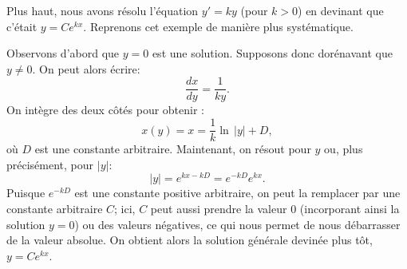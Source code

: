 \begin{example}
	Plus haut, nous avons résolu l'équation $y' = ky$ (pour $k > 0$) en devinant que c'était
	$y=Ce^{kx}$.  Reprenons cet exemple de manière plus systématique.

	Observons d'abord que  $y=0$ est une solution.  Supposons donc dorénavant que $y\not= 0$.
	On peut alors écrire:
	\begin{equation*}
		\frac{dx}{dy} = \frac{1}{ky} .
	\end{equation*}
	On intègre des deux côtés pour obtenir :
	\begin{equation*}
		x(y) = x = \frac{1}{k} \ln \, \lvert y\rvert  + D,
	\end{equation*}
	où $D$ est une constante arbitraire.
	Maintenant, on résout pour $y$ ou, plus précisément, pour $\lvert y \rvert$:
	\begin{equation*}
		\lvert y \rvert = e^{kx-kD} =  e^{-kD} e^{k x} .
	\end{equation*}
	Puisque $e^{-kD}$ est une constante positive arbitraire, on peut la remplacer par une constante arbitraire $C$;
	ici, $C$ peut aussi prendre la valeur 0 (incorporant ainsi la solution $y=0$) ou des valeurs négatives,
	ce qui nous permet de nous débarrasser de la valeur absolue.  On obtient alors la solution générale devinée plus tôt, $y = Ce^{kx}$.
\end{example}

